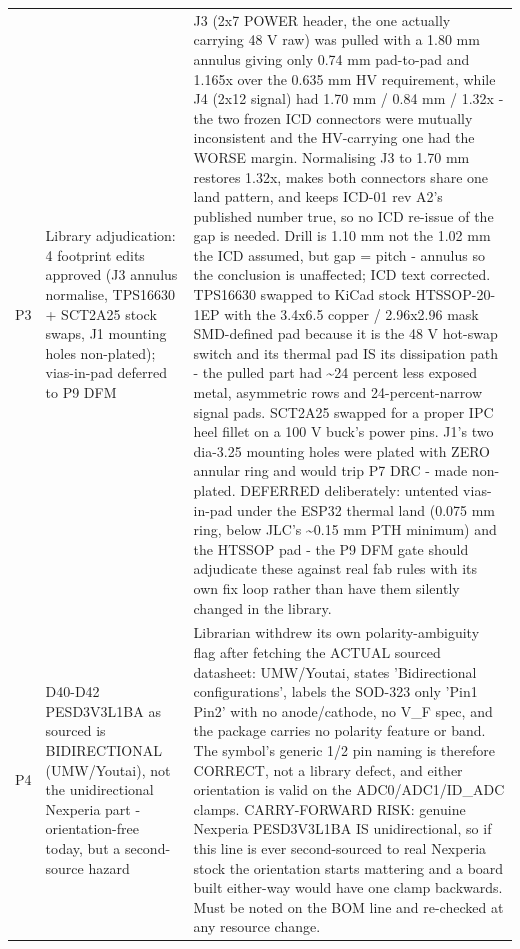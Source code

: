 \documentclass[11pt,a4paper]{article}
\begin{document}
{\begin{longtable}{lp{5.2cm}p{7.2cm}}
P3 & Library adjudication: 4 footprint edits approved (J3 annulus normalise, TPS16630 + SCT2A25 stock swaps, J1 mounting holes non-plated); vias-in-pad deferred to P9 DFM & J3 (2x7 POWER header, the one actually carrying 48 V raw) was pulled with a 1.80 mm annulus giving only 0.74 mm pad-to-pad and 1.165x over the 0.635 mm HV requirement, while J4 (2x12 signal) had 1.70 mm / 0.84 mm / 1.32x - the two frozen ICD connectors were mutually inconsistent and the HV-carrying one had the WORSE margin. Normalising J3 to 1.70 mm restores 1.32x, makes both connectors share one land pattern, and keeps ICD-01 rev A2's published number true, so no ICD re-issue of the gap is needed. Drill is 1.10 mm not the 1.02 mm the ICD assumed, but gap = pitch - annulus so the conclusion is unaffected; ICD text corrected. TPS16630 swapped to KiCad stock HTSSOP-20-1EP with the 3.4x6.5 copper / 2.96x2.96 mask SMD-defined pad because it is the 48 V hot-swap switch and its thermal pad IS its dissipation path - the pulled part had \textasciitilde{}24 percent less exposed metal, asymmetric rows and 24-percent-narrow signal pads. SCT2A25 swapped for a proper IPC heel fillet on a 100 V buck's power pins. J1's two dia-3.25 mounting holes were plated with ZERO annular ring and would trip P7 DRC - made non-plated. DEFERRED deliberately: untented vias-in-pad under the ESP32 thermal land (0.075 mm ring, below JLC's \textasciitilde{}0.15 mm PTH minimum) and the HTSSOP pad - the P9 DFM gate should adjudicate these against real fab rules with its own fix loop rather than have them silently changed in the library. \\
P4 & D40-D42 PESD3V3L1BA as sourced is BIDIRECTIONAL (UMW/Youtai), not the unidirectional Nexperia part - orientation-free today, but a second-source hazard & Librarian withdrew its own polarity-ambiguity flag after fetching the ACTUAL sourced datasheet: UMW/Youtai, states 'Bidirectional configurations', labels the SOD-323 only 'Pin1 Pin2' with no anode/cathode, no V\_F spec, and the package carries no polarity feature or band. The symbol's generic 1/2 pin naming is therefore CORRECT, not a library defect, and either orientation is valid on the ADC0/ADC1/ID\_ADC clamps. CARRY-FORWARD RISK: genuine Nexperia PESD3V3L1BA IS unidirectional, so if this line is ever second-sourced to real Nexperia stock the orientation starts mattering and a board built either-way would have one clamp backwards. Must be noted on the BOM line and re-checked at any resource change. \\

\end{longtable}}
\end{document}
